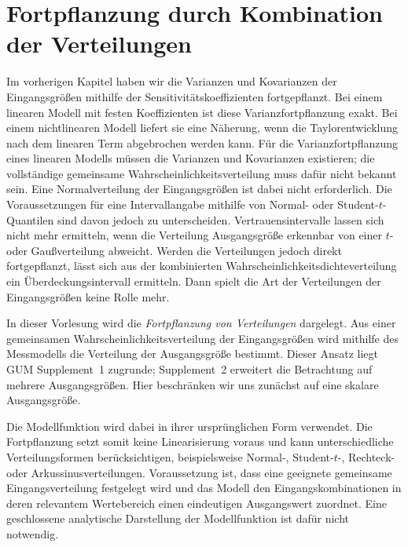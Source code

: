 \section{Fortpflanzung durch Kombination der Verteilungen}
\label{VorschauMCVerfahren}

Im vorherigen Kapitel haben wir die Varianzen und Kovarianzen der
Eingangsgrößen mithilfe der Sensitivitätskoeffizienten fortgepflanzt.
Bei einem linearen Modell mit festen Koeffizienten ist diese
Varianzfortpflanzung exakt. Bei einem nichtlinearen Modell liefert sie
eine Näherung, wenn die Taylorentwicklung nach dem linearen Term
abgebrochen werden kann. Für die Varianzfortpflanzung eines linearen
Modells müssen die Varianzen und Kovarianzen existieren; die vollständige
gemeinsame Wahrscheinlichkeitsverteilung muss dafür nicht bekannt sein.
Eine Normalverteilung der Ein\-gangs\-größen ist dabei nicht erforderlich.
Die Voraussetzungen für eine Intervallangabe mithilfe von Normal- oder
Student-$t$-Quantilen sind davon jedoch zu unterscheiden. Vertrauensintervalle lassen sich nicht mehr ermitteln, wenn die Verteilung Ausgangsgröße erkennbar von einer $t$- oder Gaußverteilung abweicht. Werden die Verteilungen jedoch direkt fortgepflanzt, lässt sich aus der kombinierten Wahrscheinlichkeitsdichteverteilung ein Überdeckungsintervall ermitteln. Dann spielt die Art der Verteilungen der Eingangsgrößen keine Rolle mehr.

In dieser Vorlesung wird die \textsl{Fortpflanzung von Verteilungen} dargelegt.
Aus einer gemeinsamen Wahrscheinlichkeitsverteilung der Eingangsgrößen
wird mithilfe des Messmodells die Verteilung der Ausgangsgröße bestimmt.
Dieser Ansatz liegt GUM Supplement~1 zugrunde; Supplement~2 erweitert
die Betrachtung auf mehrere Ausgangsgrößen.
Hier beschränken wir uns zunächst auf eine skalare Ausgangsgröße.

Die Modellfunktion wird dabei in ihrer ursprünglichen Form verwendet.
Die Fortpflanzung setzt somit keine Linearisierung voraus und kann
unterschiedliche Verteilungsformen berücksichtigen, beispiels\-weise
Normal-, Student-$t$-, Rechteck- oder Arkussinusverteilungen.
Voraussetzung ist, dass eine geeignete gemeinsame Eingangsverteilung
festgelegt wird und das Modell den Eingangskombinationen in \mbox{deren}
relevantem Wertebereich einen eindeutigen Ausgangswert zuordnet.
Eine geschlossene analytische Darstellung der Modellfunktion ist
dafür nicht notwendig.

